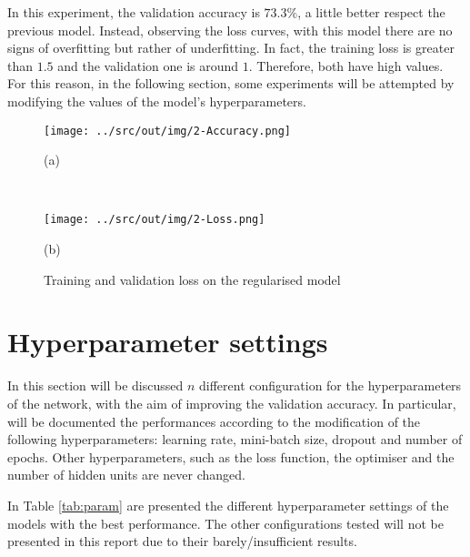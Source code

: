 \documentclass[a4paper,12pt]{article} %
\begin{document}
	In this experiment, the validation accuracy is $73.3\%$, a little better 
	respect the previous model.
	Instead, observing the loss curves, with this model there are no signs of 
	overfitting but rather of underfitting. In fact, the training loss is  
	greater than $1.5$ and the validation one is around $1$. Therefore, both 
	have high values. For this reason, in the following section, some 
	experiments will be attempted by modifying the values of the model's 
	hyperparameters.
	
	\begin{figure}[htb]
		\begin{minipage}[c]{.49\textwidth}
			\centering
			\texttt{[image: ../src/out/img/2-Accuracy.png]}
			\caption*{(a)}
		\end{minipage}
		~
		\begin{minipage}[c]{.49\textwidth}
			\centering
			\texttt{[image: ../src/out/img/2-Loss.png]}
			\caption*{(b)}
		\end{minipage}
		\caption{Training and validation loss on the regularised model}
		\label{fig:model1-performance}
	\end{figure}
	  
	\section{Hyperparameter settings}
	\label{section:hyperparam}
	
	In this section will be discussed $n$ different configuration for the 
	hyperparameters of the network, with the aim of improving the validation 
	accuracy. In particular, will be documented the performances according to 
	the modification of the following hyperparameters: learning rate, 
	mini-batch size, dropout and number of epochs.
	Other hyperparameters, such as the loss function, the optimiser and the 
	number of hidden units are never changed. %
	
	In Table \ref{tab:param} are presented the different hyperparameter 
	settings of the models with the best performance. The other configurations  
	tested will not be presented in this report due to their 
	barely/insufficient results.  
	
\end{document}
